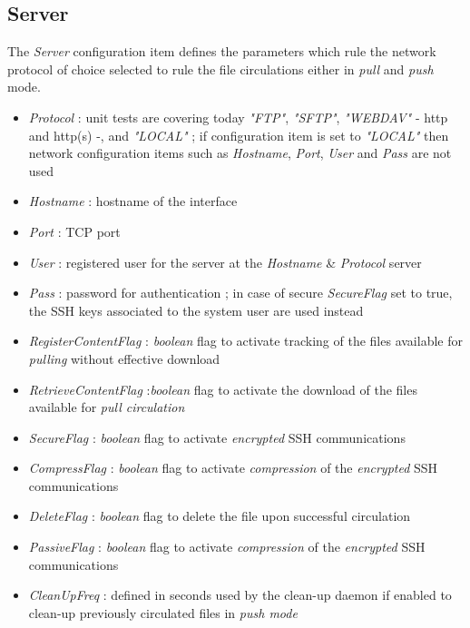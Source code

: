 \documentclass[dec_sum_main.tex]{subfiles}
\begin{document}
\subsection{Server}
The \textit{Server} configuration item defines the parameters which rule the network protocol of choice selected to rule the file circulations either in \textit{pull} and \textit{push} mode.
\par
\noindent
\begin{itemize}
	\item \textit{Protocol} : unit tests are covering today \textit{"FTP"}, \textit{"SFTP"}, \textit{"WEBDAV"} - http and http(s) -, and\textit{ "LOCAL"} ; if configuration item is set to \textit{"LOCAL"} then network configuration items such as \textit{Hostname}, \textit{Port}, \textit{User} and \textit{Pass} are not used   
	\item \textit{Hostname} : hostname of the interface
	\item \textit{Port} : TCP port
	\item \textit{User} : registered user for the server at the \textit{Hostname} \& \textit{Protocol} server
	\item \textit{Pass} : password for authentication ; in case of secure \textit{SecureFlag} set to true, the SSH keys associated to the system user are used instead
	\item \textit{RegisterContentFlag} : \textit{boolean} flag to activate tracking of the files available for \textit{pulling} without effective download
	\item \textit{RetrieveContentFlag} :\textit{boolean} flag to activate the download of the files available for \textit{pull circulation} 
	\item \textit{SecureFlag} : \textit{boolean} flag to activate \textit{encrypted} SSH communications
	\item \textit{CompressFlag} : \textit{boolean} flag to activate \textit{compression} of the \textit{encrypted} SSH communications
	\item \textit{DeleteFlag} : \textit{boolean} flag to delete the file upon successful circulation
	\item \textit{PassiveFlag} : \textit{boolean} flag to activate \textit{compression} of the \textit{encrypted} SSH communications
	\item \textit{CleanUpFreq} : defined in seconds used by the clean-up daemon if enabled to clean-up previously circulated files in \textit{push mode}	
\end{itemize}
\end{document}
